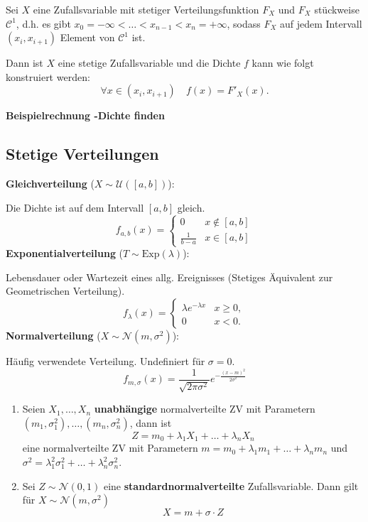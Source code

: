 Sei $X$ eine Zufallsvariable mit stetiger Verteilungsfunktion $F_X$ und $F_X$ stückweise $\mathcal{C}^1$, d.h. es gibt $x_0 = - \infty < \ldots < x_{n-1} < x_n = +\infty$, sodass $F_X$ auf jedem Intervall $(x_i, x_{i+1})$ Element von $\mathcal{C}^1$ ist. 

Dann ist $X$ eine stetige Zufallsvariable und die Dichte $f$ kann wie folgt konstruiert werden:
$$\forall x \in (x_i, x_{i+1}) \quad f(x) = F'_X(x).$$

\textbf{Beispielrechnung -Dichte finden}

\subsection{Stetige Verteilungen}
\textbf{Gleichverteilung} ($X \sim \mathcal{U}([a,b])$): 

Die Dichte ist auf dem Intervall $[a, b]$ gleich. 
$$f_{a,b}(x) = \begin{cases}
    0 & x \notin [a,b]\\
    \frac{1}{b-a} & x \in [a,b]
\end{cases}$$
\textbf{Exponentialverteilung} ($T \sim \text{Exp}(\lambda)$): 

Lebensdauer oder Wartezeit eines allg. Ereignisses (Stetiges Äquivalent zur Geometrischen Verteilung).
$$f_\lambda(x) = \begin{cases}
    \lambda e^{-\lambda x} & x \ge 0,\\
    0 & x < 0.
\end{cases}$$ 
\textbf{Normalverteilung} ($X \sim \mathcal{N}(m, \sigma^2)$): 

Häufig verwendete Verteilung. Undefiniert für $\sigma = 0$.
$$f_{m, \sigma}(x) = \frac{1}{\sqrt{2\pi\sigma^2}}e^{-\frac{(x-m)^2}{2\sigma^2}}$$
\begin{enumerate}
    \item Seien $X_1, \ldots, X_n$ \textbf{unabhängige} normalverteilte ZV mit Parametern $(m_1,\sigma_1^2), \ldots, (m_n, \sigma_n^2)$, dann ist 
    $$Z = m_0 + \lambda_1 X_1 + \ldots + \lambda_n X_n$$
    eine normalverteilte ZV mit Parametern $m = m_0 + \lambda_1 m_1 + \ldots + \lambda_n m_n$ und $\sigma^2 = \lambda_1^2 \sigma_1^2 + \ldots + \lambda_n^2 \sigma_n^2$.
    \item Sei $Z \sim \mathcal{N}(0,1)$ eine \textbf{standardnormalverteilte} Zufallsvariable. Dann gilt für $X \sim \mathcal{N}(m, \sigma^2)$ 
    $$X = m + \sigma \cdot Z$$   
\end{enumerate}

